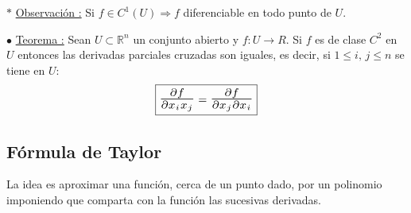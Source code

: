 \documentclass[10pt, titlepage]{article}
\newcommand{\R}{\mathbb{R}}
\newcommand{\bfrac}[2]{\scalebox{1.4}{$\frac{#1}{#2}$}}
\newcommand{\teorema}[1][\!\!]{\noindent$\bullet$ \underline{Teorema #1:} }
\newcommand{\observacion}[1][\!\!]{\noindent$\ast$ \underline{Observación #1:} }
\begin{document}
\observacion Si $f \in C^1 (U) \Rightarrow f$ diferenciable en todo punto de $U$.
\vspace{10mm}


\teorema Sean $U \subset \R^n$ un conjunto abierto y $f : U \to R$. Si $f$ es de clase $C^2$ en $U$ 
entonces las derivadas parciales cruzadas son iguales, es decir, si $1 \leq i, \, j \leq n$ se tiene en $U$:
\vspace{3mm}
\[
\boxed{
\bfrac{\partial f}{\partial x_i x_j} = \bfrac{\partial f}{\partial x_j \partial x_i}
}
\]
\vspace{5mm}


\subsection{Fórmula de Taylor}
\vspace{5mm}

La idea es aproximar una función, cerca de un punto dado, por un polinomio imponiendo que comparta con 
la función las sucesivas derivadas.
\end{document}
